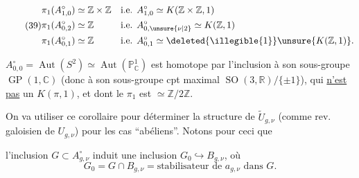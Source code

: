 \[
\tag{39}
\begin{aligned}
\pi_1(A_{1,0}^{\circ})&\simeq\mathbb Z\times\mathbb Z
&&\text{i.e. }A_{1,0}^{\circ}\simeq K(\mathbb Z\times\mathbb Z,1)\\
\pi_1(A_{0,2}^{\circ})&\simeq\mathbb Z
&&\text{i.e. }A_{0,\unsure{\nu|2}}^{\circ}\simeq K(\mathbb Z,1)\\
\pi_1(A_{0,1}^{\circ})&\simeq\mathbb Z
&&\text{i.e. }A_{0,1}^{\circ}\simeq\deleted{\illegible{1}}\unsure{K(\mathbb Z,1)}.
\end{aligned}
\]

$A_{0,0}^{\circ}=\operatorname{Aut}(S^2)\simeq\operatorname{Aut}(\mathbb P_{\mathbb C}^1)$ est homotope par l'inclusion à son sous-groupe $\operatorname{GP}(1,\mathbb C)$ (donc à son sous-groupe cpt maximal $\operatorname{SO}(3,\mathbb R)/\{\pm1\}$), qui \uline{n'est pas} un $K(\pi,1)$, et dont le $\pi_1$ est $\simeq\mathbb Z/2\mathbb Z$.

On va utiliser ce corollaire pour déterminer la structure de $\widetilde U_{g,\nu}$ (comme rev. galoisien de $U_{g,\nu}$) pour les cas ``abéliens''. Notons pour ceci que

l'inclusion $G\subset A_{g,\nu}^{\circ}$ induit une inclusion $G_0\hookrightarrow B_{g,\nu}$, où 
\[
\tag{40}
G_0=G\cap B_{g,\nu}=\text{stabilisateur de }a_{g,\nu}\text{ dans }G.
\]

